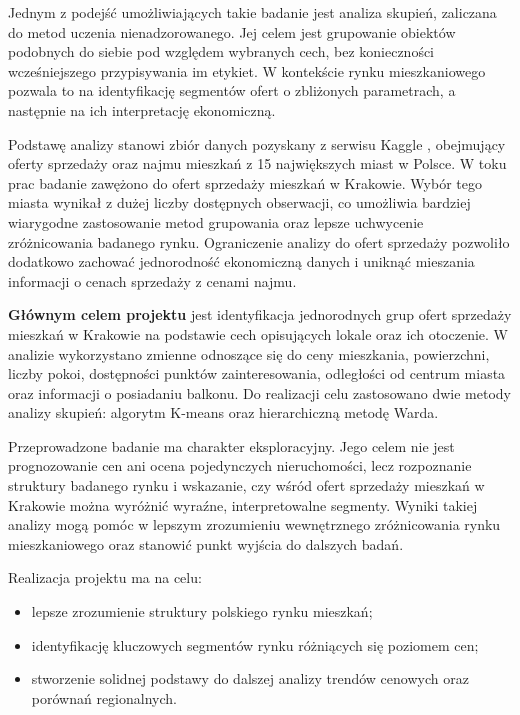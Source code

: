 \documentclass{report}
\begin{document}
Jednym z podejść umożliwiających takie badanie jest analiza skupień, zaliczana do metod uczenia nienadzorowanego. 
Jej celem jest grupowanie obiektów podobnych do siebie pod względem wybranych cech, bez konieczności wcześniejszego przypisywania im etykiet. 
W kontekście rynku mieszkaniowego pozwala to na identyfikację segmentów ofert o zbliżonych parametrach, a następnie na ich interpretację ekonomiczną.

Podstawę analizy stanowi zbiór danych pozyskany z serwisu Kaggle \cite{kaggle_apartments}, obejmujący oferty sprzedaży oraz najmu mieszkań z 15 największych miast w Polsce.
W toku prac badanie zawężono do ofert sprzedaży mieszkań w Krakowie. 
Wybór tego miasta wynikał z dużej liczby dostępnych obserwacji, co umożliwia bardziej wiarygodne zastosowanie metod grupowania oraz lepsze uchwycenie zróżnicowania badanego rynku. 
Ograniczenie analizy do ofert sprzedaży pozwoliło dodatkowo zachować jednorodność ekonomiczną danych i uniknąć mieszania informacji o cenach sprzedaży z cenami najmu.

\textbf{Głównym celem projektu} jest identyfikacja jednorodnych grup ofert sprzedaży mieszkań w Krakowie na podstawie cech opisujących lokale oraz ich otoczenie. 
W analizie wykorzystano zmienne odnoszące się do ceny mieszkania, powierzchni, liczby pokoi, dostępności punktów zainteresowania, odległości od centrum miasta oraz informacji o posiadaniu balkonu. 
Do realizacji celu zastosowano dwie metody analizy skupień: algorytm K-means oraz hierarchiczną metodę Warda.

Przeprowadzone badanie ma charakter eksploracyjny. 
Jego celem nie jest prognozowanie cen ani ocena pojedynczych nieruchomości, lecz rozpoznanie struktury badanego rynku i wskazanie, czy wśród ofert sprzedaży mieszkań w Krakowie można wyróżnić wyraźne, interpretowalne segmenty. 
Wyniki takiej analizy mogą pomóc w lepszym zrozumieniu wewnętrznego zróżnicowania rynku mieszkaniowego oraz stanowić punkt wyjścia do dalszych badań.

Realizacja projektu ma na celu:
\begin{itemize}
    \item lepsze zrozumienie struktury polskiego rynku mieszkań;
    \item identyfikację kluczowych segmentów rynku różniących się poziomem cen;
    \item stworzenie solidnej podstawy do dalszej analizy trendów cenowych oraz porównań regionalnych.
\end{itemize}
\end{document}
